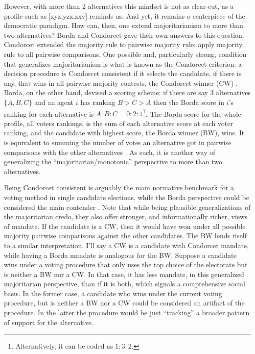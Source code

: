 \documentclass[hidelinks,11pt]{article}
\begin{document}
However, with more than 2 alternatives this mindset is not as clear-cut, as a
profile such as [xyz,yzx,zxy] reminds us. And yet, it remains a centerpiece of
the democratic paradigm. How can, then, one extend majoritarianism to more than
two alternatives? Borda and Condorcet gave their own answers to this question.
Condorcet extended the majority rule to pairwise majority rule: apply majority
rule to all pairwise comparisons. One possible and, particularly strong,
condition that generalizes majoritarianism is what is known as the Condorcet
criterion: a decision procedure is Condorcet consistent if it selects the
candidate, if there is any, that wins in all pairwise majority contests, the
Condorcet winner (CW) \parencite{Felsenthal_1992}. Borda, on the other hand,
devised a scoring scheme: if there are say 3 alternatives \(\{A,B,C\}\) and an
agent \(i\) has ranking \(B>C>A\) then the Borda score in \(i\)'s ranking for
each alternative is \(A:B:C = 0:2:1\)\footnote{Alternatively, it can be coded as
  \(1:3:2\).}. The Borda score for the whole profile, all voters rankings, is
the sum of each alternative score at each voter ranking, and the candidate with
highest score, the Borda winner (BW), wins. It is equivalent to summing the
number of votes an alternative got in pairwise comparisons with the other
alternatives \parencite{nurmi1999voting}. As such, it is another way of
generalizing the ``majoritarian/monotonic'' perspective to more than two
alternatives.

Being Condorcet consistent is arguably the main normative benchmark for a voting
method in single candidate elections, while the Borda perspective could be
considered the main contender \parencite{regenwetter2006behavioral,
  felsenthal2011review}. Note that while being plausible generalizations of the
majoritarian credo, they also offer stronger, and informationally richer, views
of mandate. If the candidate is a CW, then it would have won under all possible
majority pairwise comparisons against the other candidates. The BW lends itself
to a similar interpretation. I'll say a CW is a candidate with Condorcet
mandate, while having a Borda mandate is analogous for the BW. Suppose a
candidate wins under a voting procedure that only uses the top choice of the
electorate but is neither a BW nor a CW. In that case, it has less mandate, in
this generalized majoritarian perspective, than if it is both, which signals a
comprehensive social basis. In the former case, a candidate who wins under the
current voting procedure, but is neither a BW nor a CW could be considered an
artifact of the procedure. In the latter the procedure would be just
``tracking'' a broader pattern of support for the alternative.
\end{document}
